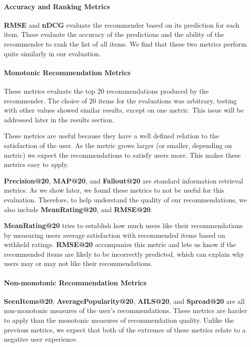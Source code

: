 \documentclass[letterpaper]{sig-alternate}
\begin{document}
  
  \paragraph{Accuracy and Ranking Metrics}
  {\bf RMSE} and {\bf nDCG} evaluate the recommender based on its prediction for each item.
  These evaluate the accuracy of the predictions and the ability of the recommender to rank the list of all items.
  We find that these two metrics perform quite similarly in our evaluation.

  \addtocounter{footnote}{1}

  \paragraph{Monotonic Recommendation Metrics}
  These metrics evaluate the top 20 recommendations produced by the recommender.
  The choice of 20 items for the evaluations was arbitrary, testing with other values showed similar results, except on one metric.
  This issue will be addressed later in the results section.
  
  These metrics are useful because they have a well defined relation to the satisfaction of the user.
  As the metric grows larger (or smaller, depending on metric) we expect the recommendations to satisfy users more.
  This makes these metrics easy to apply.

  {\bf Precision@20}, {\bf MAP@20}, and {\bf Fallout@20} are standard information retrieval metrics.
  As we show later, we found these metrics to not be useful for this evaluation.
  Therefore, to help understand the quality of our recommendations, we also include {\bf MeanRating@20}, and {\bf RMSE@20}.

  {\bf MeanRating@20} tries to establish how much users like their recommendations by measuring users average satisfaction with recommended items based on withheld ratings.
  {\bf RMSE@20} accompanies this metric and lets us know if the recommended items are likely to be incorrectly predicted, which can explain why users may or may not like their recommendations.
  
  \paragraph{Non-monotonic Recommendation Metrics}
  {\bf SeenItems@20}, {\bf AveragePopularity@20}, {\bf AILS@20}, and {\bf Spread@20} are all non-monotonic measures of the user's recommendations.
  These metrics are harder to apply than the monotonic measures of recommendation quality.
  Unlike the previous metrics, we expect that both of the extremes of these metrics relate to a negative user experience.
\end{document}
